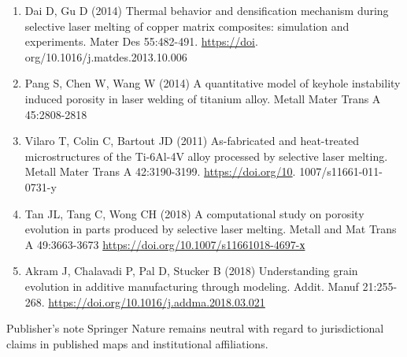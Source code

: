 \documentclass[10pt]{article}
\begin{document}
\begin{enumerate}
  \item Dai D, Gu D (2014) Thermal behavior and densification mechanism during selective laser melting of copper matrix composites: simulation and experiments. Mater Des 55:482-491. \href{https://doi}{https://doi}. org/10.1016/j.matdes.2013.10.006

  \item Pang S, Chen W, Wang W (2014) A quantitative model of keyhole instability induced porosity in laser welding of titanium alloy. Metall Mater Trans A 45:2808-2818

  \item Vilaro T, Colin C, Bartout JD (2011) As-fabricated and heat-treated microstructures of the Ti-6Al-4V alloy processed by selective laser melting. Metall Mater Trans A 42:3190-3199. \href{https://doi.org/10}{https://doi.org/10}. 1007/s11661-011-0731-y

  \item Tan JL, Tang C, Wong CH (2018) A computational study on porosity evolution in parts produced by selective laser melting. Metall and Mat Trans A 49:3663-3673 \href{https://doi.org/10.1007/s11661018-4697-%D1%85}{https://doi.org/10.1007/s11661018-4697-х}

  \item Akram J, Chalavadi P, Pal D, Stucker B (2018) Understanding grain evolution in additive manufacturing through modeling. Addit. Manuf 21:255-268. \href{https://doi.org/10.1016/j.addma.2018.03.021}{https://doi.org/10.1016/j.addma.2018.03.021}

\end{enumerate}

Publisher's note Springer Nature remains neutral with regard to jurisdictional claims in published maps and institutional affiliations.
\end{document}
